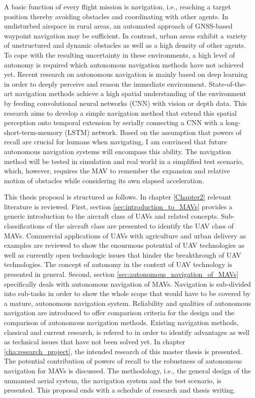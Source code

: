 A basic function of every flight mission is navigation, i.e.,
reaching a target position thereby avoiding obstacles and coordinating with other agents.
In undisturbed airspace in rural areas, an automated approach of GNSS-based waypoint navigation may be sufficient.
In contrast, urban areas exhibit a variety of unstructured and dynamic obstacles
as well as a high density of other agents. 
To cope with the resulting uncertainty in these environments,
a high level of autonomy is required which autonomous navigation methods have not achieved yet.
Recent research on autonomous navigation is mainly based on deep learning 
in order to deeply perceive and reason the immediate environment.
State-of-the-art navigation methods achieve a high spatial understanding of the environment
by feeding convolutional neural networks (CNN) with vision or depth data.
This research aims to develop a simple navigation method that extend this spatial perception onto temporal extension 
by serially connecting a CNN with a long-short-term-memory (LSTM) network.
Based on the assumption that powers of recall are crucial for humans when navigating,
I am convinced that future autonomous navigation systems will encompass this ability.
The navigation method will be tested in simulation and real world in a simplified test scenario,
which, however, requires the MAV to remember the expansion and relative motion of obstacles while considering its own elapsed acceleration.

This thesis proposal is structured as follows.
In chapter \ref{Chapter2} relevant literature is reviewed.
First, section \ref{sec:introduction_to_MAVs} provides a generic introduction to the aircraft class of UAVs and related concepts.
Sub-classifications of the aircraft class are presented to identify the UAV class of MAVs.
Commercial applications of UAVs with agriculture and urban delivery as examples  
are reviewed to show the enourmous potential of UAV technologies
as well as currently open technologic issues that hinder the breakthrough of UAV technologies.
The concept of autonomy in the context of UAV technology is presented in general.
Second, section \ref{sec:autonomous_navigation_of_MAVs} specifically deals with autonomous navigation of MAVs.
Navigation is sub-divided into sub-tasks in order 
to show the whole scope that would have to be covered by a mature, autonomous navigation system.
Reliability and qualities of autonomous navigation are introduced to
offer comparison criteria for the design and the comparison of autonomous navigation methods.
Existing navigation methods, classical and current research, is refered to
in order to identify advantages as well as technical issues that have not been solved yet.
In chapter \ref{cha:research_project}, the intended research of this master thesis is presented.
The potential contribution of powers of recall to the robustness of autonomous navigation for MAVs is discussed.
The methodology, i.e., the general design of the unmanned aerial system, the navigation system and the test scenario,
is presented.
This proposal ends with a schedule of research and thesis writing. 








